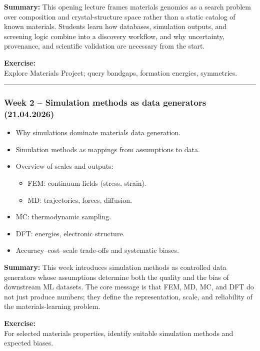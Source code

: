 \documentclass[
]{agujournal2019}
\providecommand{\tightlist}{%
  \setlength{\itemsep}{0pt}\setlength{\parskip}{0pt}}
\begin{document}
\textbf{Summary:} This opening lecture frames materials genomics as a
search problem over composition and crystal-structure space rather than
a static catalog of known materials. Students learn how databases,
simulation outputs, and screening logic combine into a discovery
workflow, and why uncertainty, provenance, and scientific validation are
necessary from the start.

\textbf{Exercise:}\\
Explore Materials Project; query bandgaps, formation energies,
symmetries.

\begin{center}\rule{0.5\linewidth}{0.5pt}\end{center}

\subsubsection{Week 2 -- Simulation methods as data generators
(21.04.2026)}\label{week-2-simulation-methods-as-data-generators-21.04.2026}

\begin{itemize}
\tightlist
\item
  Why simulations dominate materials data generation.
\item
  Simulation methods as mappings from assumptions to data.
\item
  Overview of scales and outputs:

  \begin{itemize}
  \tightlist
  \item
    FEM: continuum fields (stress, strain).
  \item
    MD: trajectories, forces, diffusion.
  \end{itemize}
\item
  MC: thermodynamic sampling.
\item
  DFT: energies, electronic structure.
\item
  Accuracy--cost--scale trade-offs and systematic biases.
\end{itemize}

\textbf{Summary:} This week introduces simulation methods as controlled
data generators whose assumptions determine both the quality and the
bias of downstream ML datasets. The core message is that FEM, MD, MC,
and DFT do not just produce numbers; they define the representation,
scale, and reliability of the materials-learning problem.

\textbf{Exercise:}\\
For selected materials properties, identify suitable simulation methods
and expected biases.
\end{document}
